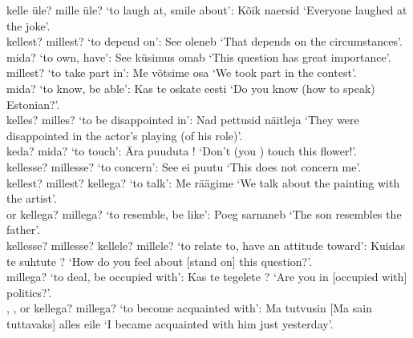  kelle üle? mille üle? `to laugh at, smile about': Kõik naersid  `Everyone laughed at the joke'. \\

 kellest? millest? `to depend on': See oleneb  `That depends on the circumstances'. \\

 mida? `to own, have': See küsimus omab  `This question has great importance'. \\

 millest? `to take part in': Me võtsime  osa `We took part in the contest'. \\

 mida? `to know, be able': Kas te oskate eesti  `Do you \pl know (how to speak) Estonian?'. \\

 kelles? milles? `to be disappointed in': Nad pettusid näitleja  `They were disappointed in the actor's playing (of his role)'. \\

 keda? mida? `to touch': Ära puuduta ! `Don't (you \sing) touch this flower!'. \\

 kellesse? millesse? `to concern': See ei puutu  `This does not concern me'. \\

 kellest? millest? kellega? `to talk': Me räägime  `We talk about the painting with the artist'. \\

 or  kellega? millega? `to resemble, be like': Poeg sarnaneb  `The son resembles the father'. \\

 kellesse? millesse? kellele? millele? `to relate to, have an attitude toward': Kuidas te suhtute ? `How do you \pl feel about [stand on] this question?'. \\

 millega? `to deal, be occupied with': Kas te tegelete ? `Are you \pl in [occupied with] politics?'. \\

, , or  kellega? millega? `to become acquainted with': Ma tutvusin  [Ma sain  tuttavaks] alles eile `I became acquainted with him just yesterday'. \\


